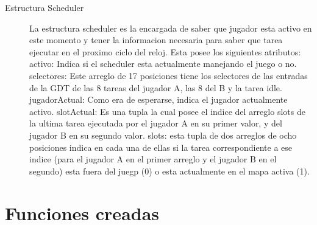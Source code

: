 \begin{description}
\item[Estructura Scheduler]
  La estructura scheduler es la encargada de saber que jugador esta activo en este momento y tener la informacion
  necesaria para saber que tarea ejecutar en el proximo ciclo del reloj.
  Esta posee los siguientes atributos:
    activo: Indica si el scheduler esta actualmente manejando el juego o no.
    selectores: Este arreglo de 17 posiciones tiene los selectores de las entradas de la GDT de
    las 8 tareas del jugador A, las 8 del B y la tarea idle.
    jugadorActual: Como era de esperarse, indica el jugador actualmente activo.
    slotActual: Es una tupla la cual posee el indice del arreglo slots de la ultima tarea ejecutada por el jugador A
    en su primer valor, y del jugador B en su segundo valor.
    slots: esta tupla de dos arreglos de ocho posiciones indica en cada una de ellas si la tarea correspondiente a ese
    indice (para el jugador A en el primer arreglo y el jugador B en el segundo) esta fuera del juegp (0) o esta actualmente
    en el mapa activa (1).

\end{description}


\section{Funciones creadas}

